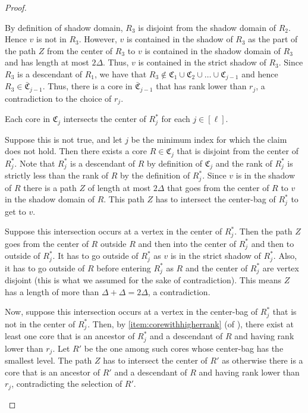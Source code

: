 \documentclass{article}
\def\core{R}
\def\C{\mathfrak{C}}
\def\barC{\bar{\C}}
\begin{document}
\begin{proof}
\begin{subproof}
		By definition of shadow domain, $\core_3$ is disjoint from the shadow domain of $\core_2$. Hence $v$ is not in $\core_3$. However, $v$ is contained in the shadow of $\core_3$ as the part of the path $Z$ from the center of $\core_3$ to $v$ is contained in the shadow domain of $\core_3$ and has length at most $2\Delta$. Thus, $v$ is contained in the strict shadow of $\core_3$. Since $\core_3$ is a descendant of $\core_1$, we have that $\core_3\notin \C_1\cup\C_2\cup\dots\cup\C_{j-1}$ and hence $\core_3\in \barC_{j-1}$. Thus, there is a core in $\barC_{j-1}$ that has rank lower than $r_j$, a contradiction to the choice of $r_j$.
	\end{subproof}
	
	\begin{claim}
		Each core in $\C_j$ intersects the center of $\core^*_j$ for each $j\in [\ell]$. 
		\label{lem:intersectQ_j}
	\end{claim}
	\begin{subproof}
		Suppose this is not true, and let $j$ be the minimum index for which the claim does not hold. Then there exists a core $\core \in \C_j$ that is disjoint from the center of $\core^*_j$. 
		Note that $\core^*_j$ is a descendant of $\core$ by definition of $\C_j$ and the rank of $\core^*_j$ is strictly less than the rank of $\core$ by the definition of $\core^*_j$.
		Since $v$ is in the shadow of $\core$ there is a path $Z$ of length at most $2 \Delta$ that goes from the center of $\core$ to $v$ in the shadow domain of $\core$.
		This path $Z$ has to intersect the center-bag of $\core^*_j$ to get to $v$.
		
		Suppose this intersection occurs at a vertex in the center of $\core^*_j$. Then the path $Z$ goes from the center of $\core$ outside $\core$ and then into the center of $\core^*_j$ and then to outside of $\core^*_j$. It has to go outside of $\core^*_j$ as $v$ is in the strict shadow of $\core^*_j$. Also, it has to go outside of $\core$ before entering $\core^*_j$ as $\core$ and the center of $\core^*_j$ are vertex disjoint (this is what we assumed for the sake of contradiction). 
		This means $Z$ has a length of more than $\Delta+\Delta=2\Delta$, a contradiction.
		
		Now, suppose this intersection occurs at a vertex in the center-bag of $\core^*_j$ that is not in the center of $\core^*_j$.
		Then, by \cref{item:corewithhigherrank} (of ), there exist at least one core that is an ancestor of $\core^*_j$ and a descendant of $\core$ and having rank lower than $r_j$.
		Let $\core'$ be the one among such cores whose center-bag has the smallest level.
		The path $Z$ has to intersect the center of $\core'$ as otherwise
		there is a core that is an ancestor of $\core'$ and a descendant of $\core$ and having rank lower than $r_j$, contradicting the selection of $\core'$.
		

\end{subproof}
\end{proof}
\end{document}
